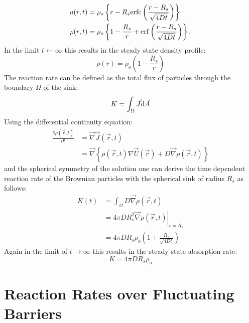 \begin{align}
    u(r,t) &= \rho_o \left\{ r - R_s {\rm erfc} \left( \frac{r - R_s}{\sqrt{4 D t}} \right) \right\} \\
    \rho(r,t) &= \rho_o \left\{ 1 - \frac{R_s}{r} + {\rm erf} \left( \frac{r - R_s}{\sqrt{4Dt}} \right) \right\}.
    \label{u(r,t)}
\end{align}
In the limit $t \leftarrow \infty$ this results in the steady state density profile:
\begin{equation}
    \rho(r) =  \rho_o \left( 1 - \frac{R_s}{r} \right)
    \label{steady state density}
\end{equation}
The reaction rate can be defined as the total flux of particles through the boundary $\Omega$ of the sink:
\begin{equation}
    K = \int_\Omega \vec{J} {\rm d}\vec{A} 
    \label{reaction rate}
\end{equation}
Using the differential continuity equation:
\begin{align}
    \frac{\partial \rho(\vec{r},t)}{\partial t}&= \vec{\nabla} \vec{J}(\vec{r},t) \\
    &= \vec{\nabla} \left\{ \rho(\vec{r},t) \nabla \vec{U}(\vec{r}) + D \vec{\nabla} \rho(\vec{r},t) \right\}
    \label{contiuity equation}
\end{align}
and the spherical symmetry of the solution one can derive the time dependent reaction rate of the Brownian particles with the spherical sink of radius $R_s$ as follows:
\begin{align}
    K(t) &= \int_\Omega D  \vec{\nabla} \rho(\vec{r},t) \\
    &= 4 \pi D R_s^2 \left. \vec{\nabla} \rho(\vec{r},t) \right|_{r = R_s}\\
    &= 4 \pi D R_s \rho_o \left( 1 + \frac{R_s}{\sqrt{4Dt}} \right)
    \label{ideal reaction rate}
\end{align}
Again in the limit of $t \rightarrow \infty$ this results in the steady state absorption rate:
\begin{equation}
    K = 4 \pi D R_s \rho_o
    \label{steady state ideal rate}
\end{equation}


\section{Reaction Rates over Fluctuating Barriers}
